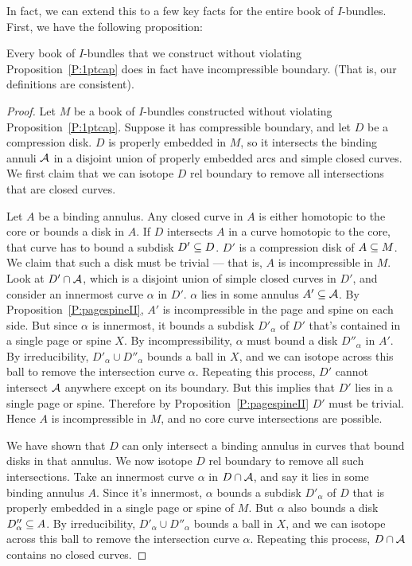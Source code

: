 In fact, we can extend this to a few key facts for the entire book of
$I$-bundles. First, we have the following proposition:

\begin{prop}\label{P:boibincomp}

Every book of $I$-bundles that we construct without violating
Proposition~\ref{P:1ptcap} does in fact have incompressible boundary. (That is,
our definitions are consistent).

\end{prop}

\begin{proof}

Let $M$ be a book of $I$-bundles constructed without violating
Proposition~\ref{P:1ptcap}. Suppose it has compressible boundary, and let $D$
be a compression disk. $D$ is properly embedded in $M$, so it intersects the
binding annuli $\mathcal{A}$ in a disjoint union of properly embedded arcs and simple
closed curves.  We first claim that we can isotope $D$ rel boundary to remove
all intersections that are closed curves.

Let $A$ be a binding annulus. Any closed curve in $A$ is either homotopic to
the core or bounds a disk in $A$. If $D$ intersects $A$ in a curve homotopic to
the core, that curve has to bound a subdisk $D' \subseteq D$. $D'$ is a compression
disk of $A \subseteq M$. We claim that such a disk must be trivial --- that is, $A$
is incompressible in $M$.  Look at $D' \cap \mathcal{A}$, which is a disjoint union of
simple closed curves in $D'$, and consider an innermost curve $\alpha$ in $D'$.
$\alpha$ lies in some annulus $A' \subseteq \mathcal{A}$.  By
Proposition~\ref{P:pagespineII}, $A'$ is incompressible in the page and spine
on each side. But since $\alpha$ is innermost, it bounds a subdisk $D'_\alpha$
of $D'$ that's contained in a single page or spine $X$. By incompressibility,
$\alpha$ must bound a disk $D''_\alpha$ in $A'$. By irreducibility, $D'_\alpha
\cup D''_\alpha$ bounds a ball in $X$, and we can isotope across this ball to
remove the intersection curve $\alpha$. Repeating this process, $D'$ cannot
intersect $\mathcal{A}$ anywhere except on its boundary. But this implies that $D'$
lies in a single page or spine.  Therefore by Proposition~\ref{P:pagespineII}
$D'$ must be trivial.  Hence $A$ is incompressible in $M$, and no core curve
intersections are possible.

We have shown that $D$ can only intersect a binding annulus in curves that
bound disks in that annulus.  We now isotope $D$ rel boundary to remove all
such intersections.  Take an innermost curve $\alpha$ in $D \cap \mathcal{A}$, and say
it lies in some binding annulus $A$. Since it's innermost, $\alpha$ bounds
a subdisk $D'_\alpha$ of $D$ that is properly embedded in a single page or
spine of $M$. But $\alpha$ also bounds a disk $D''_\alpha \subseteq A$. By
irreducibility, $D'_\alpha \cup D''_\alpha$ bounds a ball in $X$, and we can
isotope across this ball to remove the intersection curve $\alpha$. Repeating
this process, $D \cap \mathcal{A}$ contains no closed curves.


\end{proof}
